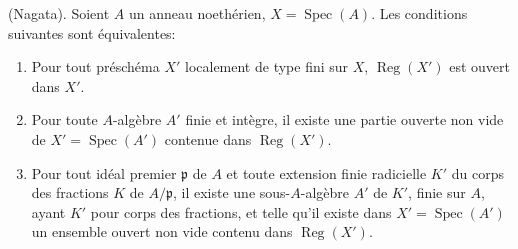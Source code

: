 \begin{theorem}[6.12.4]
\label{IV.2.s6.12.4-fr}
(Nagata). Soient $A$ un anneau noethérien,
$X=\operatorname{Spec}(A)$. Les conditions suivantes sont équivalentes:
\begin{enumerate}
\item[a)] Pour tout préschéma $X'$ localement de type fini sur $X$,
$\operatorname{Reg}(X')$ est ouvert dans $X'$.
\item[b)] Pour toute $A$-algèbre $A'$ finie et intègre, il existe une
partie ouverte non vide de $X'=\operatorname{Spec}(A')$ contenue dans
$\operatorname{Reg}(X')$.
\item[c)] Pour tout idéal premier $\mathfrak p$ de $A$ et toute extension
finie radicielle $K'$ du corps des fractions $K$ de $A/\mathfrak p$, il
existe une sous-$A$-algèbre $A'$ de $K'$, finie sur $A$, ayant $K'$ pour
corps des fractions, et telle qu'il existe dans
$X'=\operatorname{Spec}(A')$ un ensemble ouvert non vide contenu dans
$\operatorname{Reg}(X')$.
\end{enumerate}
\end{theorem}

